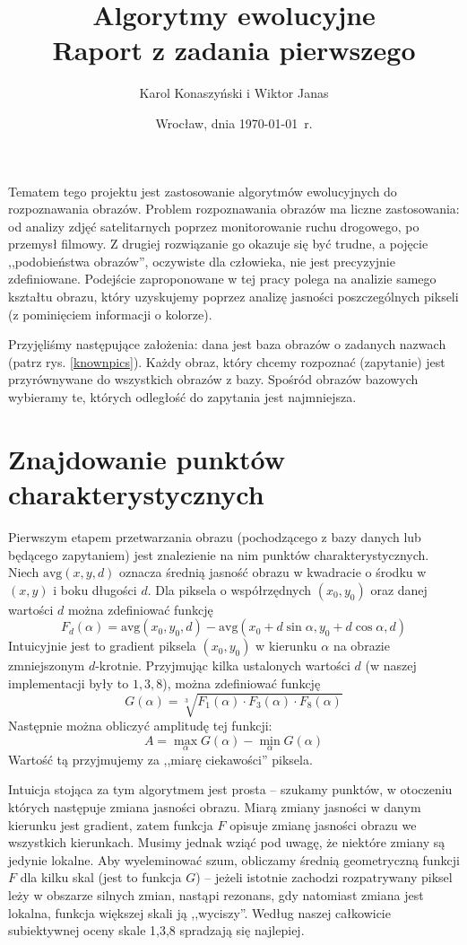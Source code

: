 \documentclass[a4paper,12pt,leqno]{article}
\title{\textbf{Algorytmy ewolucyjne}\\
       {\Large Raport z zadania pierwszego}\\[-1ex]}
\author{Karol Konaszyński i Wiktor Janas}
\date{Wrocław, dnia \today\ r.}
\newcommand{\avg}{\mathrm{avg}}
\begin{document}
\maketitle

Tematem tego projektu jest zastosowanie algorytmów ewolucyjnych do rozpoznawania obrazów. 
Problem rozpoznawania obrazów ma liczne zastosowania: od analizy zdjęć satelitarnych poprzez monitorowanie ruchu drogowego, po przemysł filmowy.
Z drugiej rozwiązanie go okazuje się być trudne, a pojęcie ,,podobieństwa obrazów'', oczywiste dla człowieka, nie jest precyzyjnie zdefiniowane.
Podejście zaproponowane w tej pracy polega na analizie samego kształtu obrazu, który uzyskujemy poprzez analizę jasności poszczególnych
pikseli (z pominięciem informacji o kolorze).

Przyjęliśmy następujące założenia: dana jest baza obrazów o zadanych nazwach (patrz rys. \ref{knownpics}). Każdy obraz, który chcemy rozpoznać
(zapytanie) jest przyrównywane do wszystkich obrazów z bazy. Spośród obrazów bazowych wybieramy te, których odległość do zapytania jest najmniejsza.

\section{Znajdowanie punktów charakterystycznych}
Pierwszym etapem przetwarzania obrazu (pochodzącego z bazy danych lub będącego zapytaniem) jest znalezienie na nim punktów charakterystycznych.
Niech $\avg(x,y,d)$ oznacza średnią jasność obrazu w kwadracie o środku w $(x,y)$ i boku długości $d$. Dla piksela o współrzędnych $(x_0,y_0)$ oraz danej
wartości $d$ można zdefiniować funkcję
\[ F_d(\alpha) = \avg(x_0,y_0,d) - \avg( x_0+d\sin\alpha, y_0+d\cos\alpha, d) \]
Intuicyjnie jest to gradient piksela $(x_0,y_0)$ w kierunku $\alpha$ na obrazie zmniejszonym $d$-krotnie. Przyjmując kilka ustalonych wartości $d$
(w naszej implementacji były to $1,3,8$), można zdefiniować funkcję
\[ G(\alpha) = \sqrt[3]{F_1(\alpha) \cdot F_3(\alpha) \cdot F_8(\alpha)} \]
Następnie można obliczyć amplitudę tej funkcji:
\[ A = \max_\alpha G(\alpha) - \min_\alpha G(\alpha) \]
Wartość tą przyjmujemy za ,,miarę ciekawości'' piksela. 

Intuicja stojąca za tym algorytmem jest prosta -- szukamy punktów, w otoczeniu których następuje zmiana jasności obrazu. Miarą zmiany jasności w danym
kierunku jest gradient, zatem funkcja $F$ opisuje zmianę jasności obrazu we wszystkich kierunkach. Musimy jednak wziąć pod uwagę, że niektóre zmiany są
jedynie lokalne. Aby wyeleminować szum, obliczamy średnią geometryczną funkcji $F$ dla kilku skal (jest to funkcja $G$) -- jeżeli istotnie zachodzi
rozpatrywany piksel leży w obszarze silnych zmian, nastąpi rezonans, gdy natomiast zmiana jest lokalna, funkcja większej skali ją ,,wyciszy''.
Według naszej całkowicie subiektywnej oceny skale 1,3,8 spradzają się najlepiej.
\end{document}
